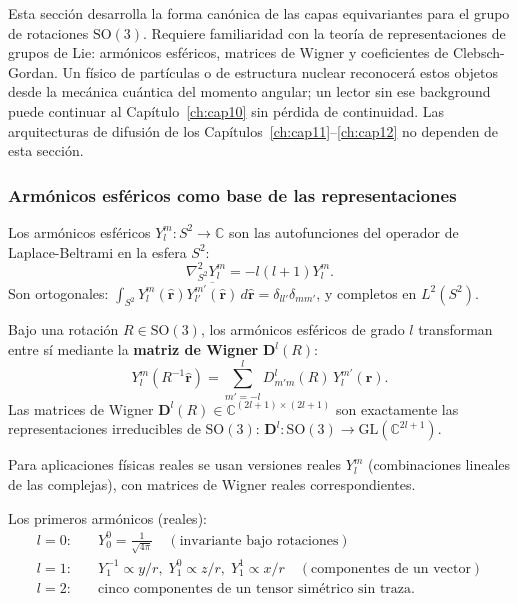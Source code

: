 Esta sección desarrolla la forma canónica de las capas equivariantes
para el grupo de rotaciones $\mathrm{SO}(3)$. Requiere familiaridad
con la teoría de representaciones de grupos de Lie: armónicos
esféricos, matrices de Wigner y coeficientes de Clebsch-Gordan.
Un físico de partículas o de estructura nuclear reconocerá estos
objetos desde la mecánica cuántica del momento angular; un lector
sin ese background puede continuar al Capítulo~\ref{ch:cap10} sin
pérdida de continuidad. Las arquitecturas de difusión de los
Capítulos~\ref{ch:cap11}--\ref{ch:cap12} no dependen de esta sección.

\subsubsection*{Armónicos esféricos como base de las representaciones}

Los armónicos esféricos $Y_l^m: S^2 \to \mathbb{C}$ son las autofunciones del
operador de Laplace-Beltrami en la esfera $S^2$:
\[
  \nabla^2_{S^2} Y_l^m = -l(l+1)Y_l^m.
\]
Son ortogonales: $\int_{S^2} Y_l^m(\hat{\bm{r}})\overline{Y_{l'}^{m'}(\hat{\bm{r}})}\,
d\hat{\bm{r}} = \delta_{ll'}\delta_{mm'}$, y completos en $L^2(S^2)$.

Bajo una rotación $R \in \mathrm{SO}(3)$, los armónicos esféricos de grado $l$
transforman entre sí mediante la \textbf{matriz de Wigner} $\bm{D}^l(R)$:
\begin{equation}
  Y_l^m(R^{-1}\hat{\bm{r}}) = \sum_{m'=-l}^l D_{m'm}^l(R)\,Y_l^{m'}(\hat{\bm{r}}).
  \label{eq:wigner}
\end{equation}
Las matrices de Wigner $\bm{D}^l(R) \in \mathbb{C}^{(2l+1)\times(2l+1)}$
son exactamente las representaciones irreducibles de $\mathrm{SO}(3)$:
$\bm{D}^l: \mathrm{SO}(3) \to \mathrm{GL}(\mathbb{C}^{2l+1})$.

Para aplicaciones físicas reales se usan versiones reales $Y_l^m$ (combinaciones
lineales de las complejas), con matrices de Wigner reales correspondientes.

Los primeros armónicos (reales):
\begin{align*}
  l=0:&\quad Y_0^0 = \frac{1}{\sqrt{4\pi}} \quad (\text{invariante bajo rotaciones}) \\
  l=1:&\quad Y_1^{-1} \propto y/r,\; Y_1^0 \propto z/r,\; Y_1^1 \propto x/r
        \quad (\text{componentes de un vector}) \\
  l=2:&\quad \text{cinco componentes de un tensor simétrico sin traza.}
\end{align*}

